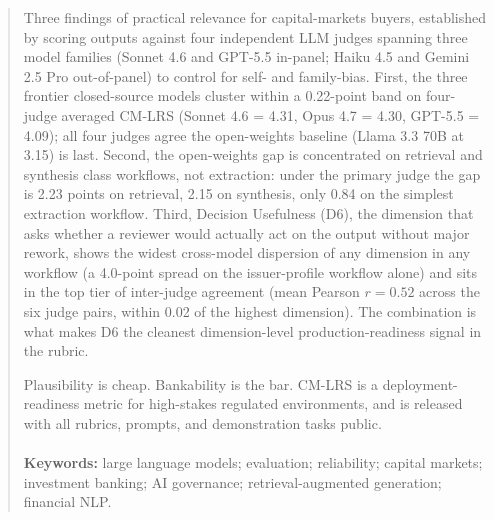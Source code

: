 \documentclass[11pt]{article}
\begin{document}
\begin{abstract}
Three findings of practical relevance for capital-markets buyers, established by scoring outputs against four independent LLM judges spanning three model families (Sonnet 4.6 and GPT-5.5 in-panel; Haiku 4.5 and Gemini 2.5 Pro out-of-panel) to control for self- and family-bias. First, the three frontier closed-source models cluster within a 0.22-point band on four-judge averaged CM-LRS (Sonnet 4.6 = 4.31, Opus 4.7 = 4.30, GPT-5.5 = 4.09); all four judges agree the open-weights baseline (Llama 3.3 70B at 3.15) is last. Second, the open-weights gap is concentrated on retrieval and synthesis class workflows, not extraction: under the primary judge the gap is 2.23 points on retrieval, 2.15 on synthesis, only 0.84 on the simplest extraction workflow. Third, Decision Usefulness (D6), the dimension that asks whether a reviewer would actually act on the output without major rework, shows the widest cross-model dispersion of any dimension in any workflow (a 4.0-point spread on the issuer-profile workflow alone) and sits in the top tier of inter-judge agreement (mean Pearson $r = 0.52$ across the six judge pairs, within 0.02 of the highest dimension). The combination is what makes D6 the cleanest dimension-level production-readiness signal in the rubric.

Plausibility is cheap. Bankability is the bar. CM-LRS is a deployment-readiness metric for high-stakes regulated environments, and is released with all rubrics, prompts, and demonstration tasks public.
\\\\
\noindent\textbf{Keywords:} large language models; evaluation; reliability; capital markets; investment banking; AI governance; retrieval-augmented generation; financial NLP.
\end{abstract}

\noindent{}
\end{document}
